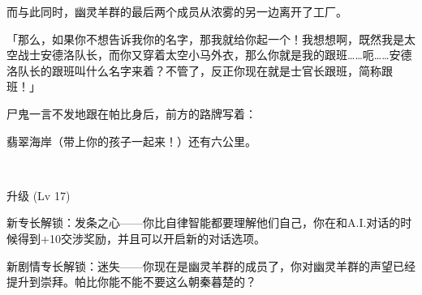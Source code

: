 而与此同时，幽灵羊群的最后两个成员从浓雾的另一边离开了工厂。

「那么，如果你不想告诉我你的名字，那我就给你起一个！我想想啊，既然我是太空战士安德洛队长，而你又穿着太空小马外衣，那么你就是我的跟班……呃……安德洛队长的跟班叫什么名字来着？不管了，反正你现在就是士官长跟班，简称跟班！」

尸鬼一言不发地跟在帕比身后，前方的路牌写着：

\begin{center}
翡翠海岸（带上你的孩子一起来！）还有六公里。    
\end{center}

~\vfill

\begin{note}
    升级 (Lv 17) 

    新专长解锁：发条之心——你比自律智能都要理解他们自己，你在和A.I.对话的时候得到+10交涉奖励，并且可以开启新的对话选项。

    新剧情专长解锁：迷失——你现在是幽灵羊群的成员了，你对幽灵羊群的声望已经提升到崇拜。帕比你能不能不要这么朝秦暮楚的？
\end{note}




